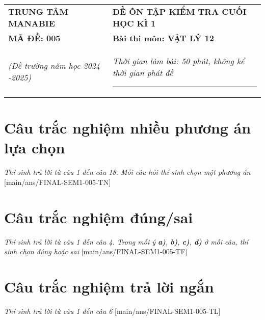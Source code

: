\begin{tabular}{M{6.5cm}M{11cm}}
	\textbf{TRUNG TÂM MANABIE}& \textbf{ĐỀ ÔN TẬP KIỂM TRA CUỐI HỌC KÌ 1}\\
	\textbf{MÃ ĐỀ: 005}& \textbf{Bài thi môn: VẬT LÝ 12}\\
	\textit{(Đề trường  năm học 2024 -2025)}& \textit{Thời gian làm bài: 50 phút, không kể thời gian phát đề}
	
	\noindent\rule{4cm}{0.8pt} \\
\end{tabular}
\setcounter{section}{0}
\section{Câu trắc nghiệm nhiều phương án lựa chọn}
\textit{Thí sinh trả lời từ câu 1 đến câu 18. Mỗi câu hỏi thí sinh chọn một phương án}
\setcounter{ex}{0}
[main/ans/FINAL-SEM1-005-TN]
\begin{ex}
	
	\choice
	{}
	{}
	{}
	{}
	\loigiai{}
\end{ex}


\section{Câu trắc nghiệm đúng/sai} 
\textit{Thí sinh trả lời từ câu 1 đến câu 4. Trong mỗi ý \textbf{a)}, \textbf{b)}, \textbf{c)}, \textbf{d)} ở mỗi câu, thí sinh chọn đúng hoặc sai}
\setcounter{ex}{0}
[main/ans/FINAL-SEM1-005-TF]
\begin{ex}
	
	\choiceTF[t]
	{}
	{}
	{}
	{}
	\loigiai{}
\end{ex}



\section{Câu trắc nghiệm trả lời ngắn} \textit{Thí sinh trả lời từ câu 1 đến câu 6}
\setcounter{ex}{0}
[main/ans/FINAL-SEM1-005-TL]
\begin{ex}
	
	\shortans[oly]{ }
	\loigiai{
		
	}
\end{ex}


